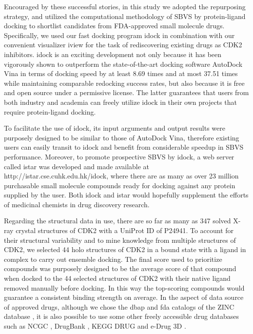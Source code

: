 Encouraged by these successful stories, in this study we adopted the repurposing strategy, and utilized the computational methodology of SBVS by protein-ligand docking to shortlist candidates from FDA-approved small molecule drugs. Specifically, we used our fast docking program idock \citep{1153,1362} in combination with our convenient visualizer iview \citep{1366} for the task of rediscovering existing drugs as CDK2 inhibitors. idock is an exciting development not only because it has been vigorously shown \citep{1362} to outperform the state-of-the-art docking software AutoDock Vina \citep{595} in terms of docking speed by at least 8.69 times and at most 37.51 times while maintaining comparable redocking success rates, but also because it is free and open source under a permissive license. The latter guarantees that users from both industry and academia can freely utilize idock in their own projects that require protein-ligand docking.

To facilitate the use of idock, its input arguments and output results were purposely designed to be similar to those of AutoDock Vina, therefore existing users can easily transit to idock and benefit from considerable speedup in SBVS performance. Moreover, to promote prospective SBVS by idock, a web server called istar \citep{1362} was developed and made available at http://istar.cse.cuhk.edu.hk/idock, where there are as many as over 23 million purchasable small molecule compounds ready for docking against any protein supplied by the user. Both idock \citep{1153} and istar \citep{1362} would hopefully supplement the efforts of medicinal chemists in drug discovery research.

Regarding the structural data in use, there are so far as many as 347 solved X-ray crystal structures of CDK2 with a UniProt ID of P24941. To account for their structural variability and to mine knowledge from multiple structures of CDK2, we selected 44 holo structures of CDK2 in a bound state with a ligand in complex to carry out ensemble docking. The final score used to prioritize compounds was purposely designed to be the average score of that compound when docked to the 44 selected structures of CDK2 with their native ligand removed manually before docking. In this way the top-scoring compounds would guarantee a consistent binding strength on average. In the aspect of data source of approved drugs, although we chose the dbap and fda catalogs of the ZINC database \citep{532,1178}, it is also possible to use some other freely accessible drug databases such as NCGC \citep{1608}, DrugBank \citep{1594}, KEGG DRUG \citep{1595} and e-Drug 3D \citep{1125}.


